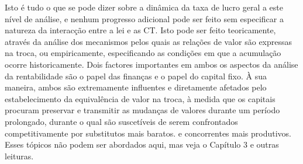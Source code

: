 Isto é tudo o que se pode dizer sobre a dinâmica da taxa de lucro geral a este nível de análise, e nenhum progresso adicional pode ser feito sem especificar a natureza da interacção entre a lei e as CT. Isto pode ser feito teoricamente, através da análise dos mecanismos pelos quais as relações de valor são expressas na troca, ou empiricamente, especificando as condições em que a acumulação ocorre historicamente. Dois factores importantes em ambos os aspectos da análise da rentabilidade são o papel das finanças e o papel do capital fixo. À sua maneira, ambos são extremamente influentes e diretamente afetados pelo estabelecimento da equivalência de valor na troca, à medida que os capitais procuram preservar e transmitir as mudanças de valores durante um período prolongado, durante o qual são suscetíveis de serem confrontados competitivamente por substitutos mais baratos. e concorrentes mais produtivos. Esses tópicos não podem ser abordados aqui, mas veja o Capítulo {\color{blue}3} e outras leituras.
 \par 
